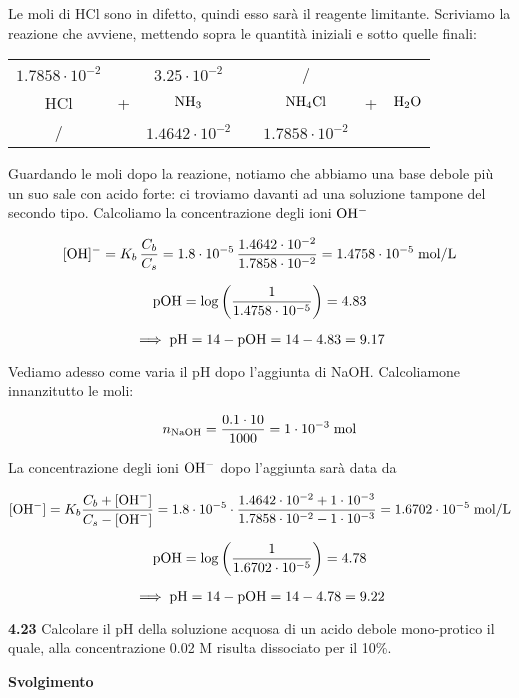 Le moli di HCl sono in difetto, quindi esso sarà il reagente limitante. Scriviamo la reazione che avviene, mettendo sopra le quantità iniziali e sotto quelle finali:

\begin{center}
    \begin{tabular}{ccccccc}
        $1.7858 \cdot 10^{-2}$ &  & $3.25 \cdot 10^{-2}$ & & / & &\\
        HCl & + & $\rm NH_3$ & \ce{->} & $\rm NH_4Cl$ & + & $\rm H_2O$\\
        / &  &  $1.4642 \cdot 10^{-2}$ & & $1.7858 \cdot 10^{-2}$ & &\\
    \end{tabular}
\end{center}

Guardando le moli dopo la reazione, notiamo che abbiamo una base debole più un suo sale con acido forte: ci troviamo davanti ad una soluzione tampone del secondo tipo. Calcoliamo la concentrazione degli ioni $\rm OH^-$

$$[\text{OH}]^-=K_b\,\frac{C_b}{C_s}
=1.8 \cdot 10^{-5}\,\frac{1.4642 \cdot 10^{-2}}{1.7858 \cdot 10^{-2}}
=1.4758 \cdot 10^{-5} \; \rm mol/L$$

$$\rm pOH=\log \left( \frac{1}{1.4758 \cdot 10^{-5}} \right)=4.83$$

$$\implies \rm pH=14-pOH=14-4.83=9.17$$

Vediamo adesso come varia il pH dopo l'aggiunta di NaOH. Calcoliamone innanzitutto le moli:

$$n_{\rm NaOH}=\frac{0.1 \cdot 10}{1000}=1 \cdot 10^{-3} \; \rm mol$$

La concentrazione degli ioni $\rm OH^-$ dopo l'aggiunta sarà data da

$${[\text{OH}^-]}=K_b \frac{C_b + {[\text{OH}^-]}}{C_s - \rm{[\text{OH}^-]}}
=1.8 \cdot 10^{-5} \cdot \frac{1.4642 \cdot 10^{-2} + 1 \cdot 10^{-3}}{1.7858 \cdot 10^{-2} - 1 \cdot 10^{-3}}
=1.6702 \cdot 10^{-5} \; \rm mol/L$$

$$\rm pOH=\log \left( \frac{1}{1.6702 \cdot 10^{-5}} \right)=4.78$$

$$\implies \rm pH=14-pOH=14-4.78=9.22$$

\vspace{0.2cm}\textbf{4.23} Calcolare il pH della soluzione acquosa di un acido debole mono-protico il quale, alla concentrazione 0.02 M risulta dissociato per il 10\%.

\vspace{0.2cm}\large\textbf{Svolgimento}\normalsize

